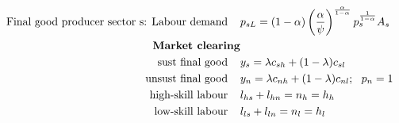\begin{align}
\\
%
\text{Final good producer sector s: Labour demand}\hspace{4mm}&
p_{sL} =%
(1-\alpha)\left(\frac{\alpha}{\psi}\right)^\frac{\alpha}{1- \alpha}p_s^\frac{1}{1-\alpha}A_s\label{mod:psl}
\\
%
\text{\textbf{Market clearing}}& \nonumber\\
\text{sust final good}\hspace{4mm}& y_s=\lambda c_{sh}+(1-\lambda) c_{sl}\label{mod:sus_market}\\
\text{unsust final good}\hspace{4mm}& y_n=\lambda c_{nh}+(1-\lambda) c_{nl};\ \  p_n=1\label{mod:unsus_market}\\
\text{high-skill labour}\hspace{4mm}& l_{hs}+l_{hn}=n_h=h_h\label{mod:hh_market}\\
\text{low-skill labour}\hspace{4mm}&l_{ls}+l_{ln}=n_l=h_l\label{mod:hl_market}
\end{align}

\newpage 
